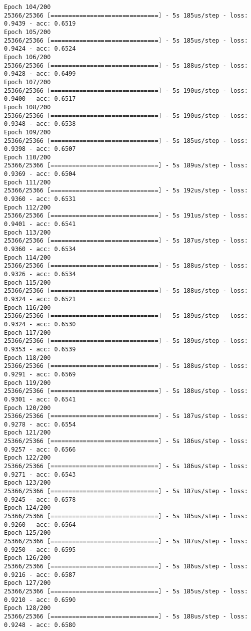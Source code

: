 \documentclass[11pt]{article}
\begin{document}
\begin{Verbatim}[commandchars=\\\{\}]
Epoch 104/200
25366/25366 [==============================] - 5s 185us/step - loss: 0.9439 - acc: 0.6519
Epoch 105/200
25366/25366 [==============================] - 5s 185us/step - loss: 0.9424 - acc: 0.6524
Epoch 106/200
25366/25366 [==============================] - 5s 188us/step - loss: 0.9428 - acc: 0.6499
Epoch 107/200
25366/25366 [==============================] - 5s 190us/step - loss: 0.9400 - acc: 0.6517
Epoch 108/200
25366/25366 [==============================] - 5s 190us/step - loss: 0.9348 - acc: 0.6538
Epoch 109/200
25366/25366 [==============================] - 5s 185us/step - loss: 0.9398 - acc: 0.6507
Epoch 110/200
25366/25366 [==============================] - 5s 189us/step - loss: 0.9369 - acc: 0.6504
Epoch 111/200
25366/25366 [==============================] - 5s 192us/step - loss: 0.9360 - acc: 0.6531
Epoch 112/200
25366/25366 [==============================] - 5s 191us/step - loss: 0.9401 - acc: 0.6541
Epoch 113/200
25366/25366 [==============================] - 5s 187us/step - loss: 0.9360 - acc: 0.6534
Epoch 114/200
25366/25366 [==============================] - 5s 188us/step - loss: 0.9326 - acc: 0.6534
Epoch 115/200
25366/25366 [==============================] - 5s 188us/step - loss: 0.9324 - acc: 0.6521
Epoch 116/200
25366/25366 [==============================] - 5s 189us/step - loss: 0.9324 - acc: 0.6530
Epoch 117/200
25366/25366 [==============================] - 5s 189us/step - loss: 0.9353 - acc: 0.6539
Epoch 118/200
25366/25366 [==============================] - 5s 188us/step - loss: 0.9291 - acc: 0.6569
Epoch 119/200
25366/25366 [==============================] - 5s 188us/step - loss: 0.9301 - acc: 0.6541
Epoch 120/200
25366/25366 [==============================] - 5s 187us/step - loss: 0.9278 - acc: 0.6554
Epoch 121/200
25366/25366 [==============================] - 5s 186us/step - loss: 0.9257 - acc: 0.6566
Epoch 122/200
25366/25366 [==============================] - 5s 186us/step - loss: 0.9271 - acc: 0.6543
Epoch 123/200
25366/25366 [==============================] - 5s 187us/step - loss: 0.9245 - acc: 0.6578
Epoch 124/200
25366/25366 [==============================] - 5s 185us/step - loss: 0.9260 - acc: 0.6564
Epoch 125/200
25366/25366 [==============================] - 5s 187us/step - loss: 0.9250 - acc: 0.6595
Epoch 126/200
25366/25366 [==============================] - 5s 186us/step - loss: 0.9216 - acc: 0.6587
Epoch 127/200
25366/25366 [==============================] - 5s 185us/step - loss: 0.9210 - acc: 0.6590
Epoch 128/200
25366/25366 [==============================] - 5s 188us/step - loss: 0.9248 - acc: 0.6580

\end{Verbatim}
\end{document}
